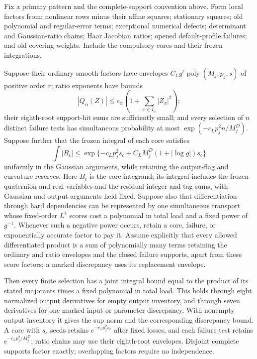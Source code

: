 \begin{lemma}\label{lem:rg-joint}
Fix a primary pattern and the complete-support convention above.  Form
local factors from: nonlinear rows minus their affine squares;
stationary squares; old polynomial and regular-error terms; exceptional
numerical defects; determinant and Gaussian-ratio chains; Haar Jacobian
ratios; opened default-profile failures; and old covering weights.
Include the compulsory cores and their frozen integrations.

Suppose their ordinary smooth factors have envelopes
$C_Lg^r\operatorname{poly}(M_j,p_j,s)$ of positive order $r$; ratio
exponents have bounds
\[
 |Q_\alpha(Z)|\le e_\alpha
        \left(1+\sum_{x\in I_\alpha}|Z_x|^2\right);
\]
their eighth-root support-hit sums are sufficiently small; and every selection of $n$ distinct
failure tests has simultaneous probability at most
$\exp(-c_Lp_j^2n/M_j^D)$.  Suppose further that the frozen integral of each core satisfies
\[
 \int|B_c|\le\exp\{-c_Lp_j^2s_c+
 C_LM_j^D(1+|\log g|)s_c\}
\]
uniformly in the Gaussian arguments,
while retaining the output-flag and curvature reserves.  Here $B_c$ is
the core integrand; its integral includes the frozen quaternion and real
variables and the residual integer and tag sums, with Gaussian and output
arguments held fixed.  Suppose also that differentiation through
hard dependencies can be represented by one simultaneous transport
whose fixed-order $L^4$ scores cost a polynomial in total load and a
fixed power of $g^{-1}$.  Whenever such a negative power occurs, retain
a core, failure, or exponentially accurate factor to pay it.
Assume explicitly that every allowed differentiated product is a sum of
polynomially many terms retaining the ordinary and ratio envelopes and
the closed failure supports, apart from these score factors; a marked
discrepancy uses its replacement envelope.

Then every finite selection has a joint integral bound equal to the
product of its stated majorants times a fixed polynomial in total load.
This holds through eight normalized output derivatives for empty output
inventory, and through seven derivatives for one marked input or
parameter discrepancy.  With nonempty output inventory it gives the
sup norm and the corresponding discrepancy bound.  A core with $s_c$ seeds retains
$e^{-c_Lp_j^2s_c}$ after fixed losses, and each failure test retains
$e^{-c_Lp_j^2/M_j^D}$; ratio chains may use their eighth-root envelopes.  Disjoint complete supports factor
exactly; overlapping factors require no independence.
\end{lemma}

